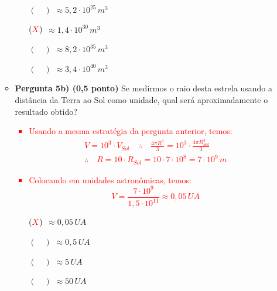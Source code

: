 \documentclass[a4paper, 12pt]{article}
\newcommand{\red}[1]{\textcolor{red}{#1}}
\begin{document}
\begin{flushleft}
\begin{itemize}
\begin{itemize}
\begin{itemize}
                            \item[$(\quad)$] $\approx 5,2 \cdot 10^{25} \, m^3$
                            \item[$(\red{X})$] $\approx 1,4 \cdot 10^{30} \, m^3$
                            \item[$(\quad)$] $\approx 8,2 \cdot 10^{35} \, m^3$
                            \item[$(\quad)$] $\approx 3,4 \cdot 10^{40} \, m^3$
                        \end{itemize}
                    \item \textbf{Pergunta 5b) (0,5 ponto)} Se medirmos o raio desta estrela usando a distância da Terra ao Sol como unidade, qual será aproximadamente o resultado obtido?
                        \red{\begin{itemize}
                            \item Usando a mesma estratégia da pergunta anterior, temos:
                                \begin{equation*} \begin{gathered}
                                    V=10^3 \cdot V_{Sol} \quad \therefore \quad \frac{4\pi R^3}{3}=10^3 \cdot \frac{4 \pi R_{Sol}^3}{3}\\
                                    \therefore \quad R=10 \cdot R_{Sol} =10 \cdot 7 \cdot 10^8 = 7 \cdot 10^9 \, m
                                \end{gathered} \end{equation*}
                            \item Colocando em unidades astronômicas, temos:
                                \begin{equation*}
                                    V=\frac{7 \cdot 10^9}{1,5 \cdot 10^{11}} \approx 0,05 \, UA
                                \end{equation*}
                        \end{itemize}}
                        \begin{itemize}
                            \item[$(\red{X})$] $\approx 0,05 \, UA$
                            \item[$(\quad)$] $\approx 0,5 \, UA$
                            \item[$(\quad)$] $\approx 5 \, UA$
                            \item[$(\quad)$] $\approx 50 \, UA$
                        \end{itemize}
                \end{itemize}


\end{itemize}
\end{flushleft}
\end{document}
